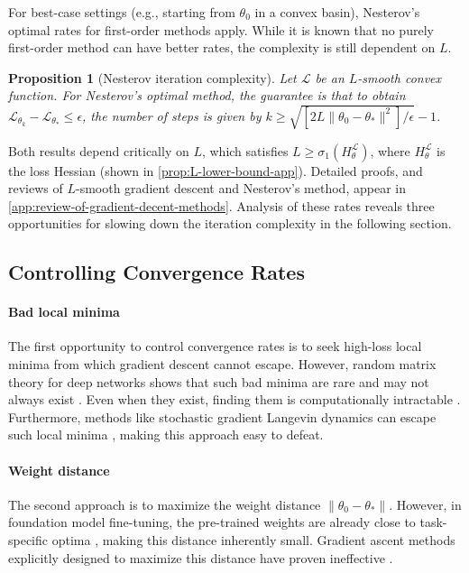 \documentclass{article}
\theoremstyle{plain}
\newtheorem{proposition}[theorem]{Proposition}
\theoremstyle{definition}
\theoremstyle{remark}
\begin{document}
For best-case settings (e.g., starting from $\theta_0$ in a convex basin), Nesterov's optimal rates for first-order methods apply. While it is known that no purely first-order method can have better rates, the complexity is still dependent on $L$.

\begin{proposition}[Nesterov iteration complexity]
\label{prop:nesterov-iteration}
Let $\mathcal{L}$ be an $L$-smooth convex function. For Nesterov's optimal method, the guarantee is that to obtain $\mathcal{L}_{\theta_k} - \mathcal{L}_{\theta_*} \le \epsilon$, the number of steps is given by \(
 k \ge\sqrt{ \left[ 2L\|\theta_0 - \theta_*\|^2 \right]/\epsilon} - 1 
\).
\end{proposition}

Both results depend critically on $L$, which satisfies $L \geq \sigma_1(H^{\mathcal{L}}_{\theta})$, where $H^{\mathcal{L}}_{\theta}$ is the loss Hessian (shown in \cref{prop:L-lower-bound-app}). Detailed proofs, and reviews of $L$-smooth gradient descent and Nesterov's method, appear in \cref{app:review-of-gradient-decent-methods}. Analysis of these rates reveals three opportunities for slowing down the iteration complexity in the following section.

\subsection{Controlling Convergence Rates}
\label{remark:why-curvature}

\paragraph{Bad local minima} The first opportunity to control convergence rates is to seek high-loss local minima from which gradient descent cannot escape. However, random matrix theory for deep networks shows that such bad minima are rare and may not always exist \citep{choromanska2015loss, baskerville2022universal, baskerville2022appearance}. Even when they exist, finding them is computationally intractable \citep{bubeck2020trapgradientflow,hollender23a,huanjian2025adaptive}. Furthermore, methods like stochastic gradient Langevin dynamics can escape such local minima \citep{raginsky2017non,tzen2018local}, making this approach easy to defeat.
\paragraph{Weight distance} The second approach is to maximize the weight distance $\|\theta_0 - \theta_{\ast}\|$. However, in foundation model fine-tuning, the pre-trained weights are already close to task-specific optima \citep{neyshabur2020being}, making this distance inherently small. Gradient ascent methods explicitly designed to maximize this distance have proven ineffective \citep{rosati-etal-2024-immunization, golatkar2019eternal}.
\end{document}
